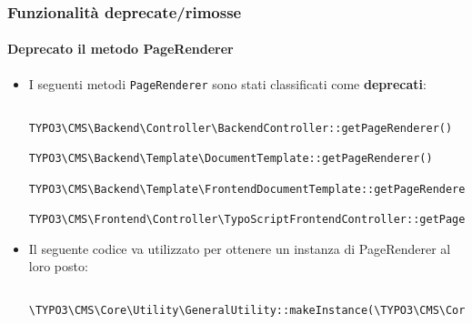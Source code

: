 \begin{frame}[fragile]
\begin{itemize}
	\end{itemize}

\end{frame}


\begin{frame}[fragile]
	\frametitle{Funzionalità deprecate/rimosse}
	\framesubtitle{Deprecato il metodo PageRenderer}

	\lstset{basicstyle=\tiny\ttfamily}

	\begin{itemize}
		\item I seguenti metodi \texttt{PageRenderer} sono stati classificati come \textbf{deprecati}:

			\begin{lstlisting}
				TYPO3\CMS\Backend\Controller\BackendController::getPageRenderer()
				TYPO3\CMS\Backend\Template\DocumentTemplate::getPageRenderer()
				TYPO3\CMS\Backend\Template\FrontendDocumentTemplate::getPageRenderer()
				TYPO3\CMS\Frontend\Controller\TypoScriptFrontendController::getPageRenderer()
			\end{lstlisting}

		\item Il seguente codice va utilizzato per ottenere un instanza di PageRenderer al loro posto:

			\begin{lstlisting}
				\TYPO3\CMS\Core\Utility\GeneralUtility::makeInstance(\TYPO3\CMS\Core\Page\PageRenderer::class)
			\end{lstlisting}

	\end{itemize}

\end{frame}


